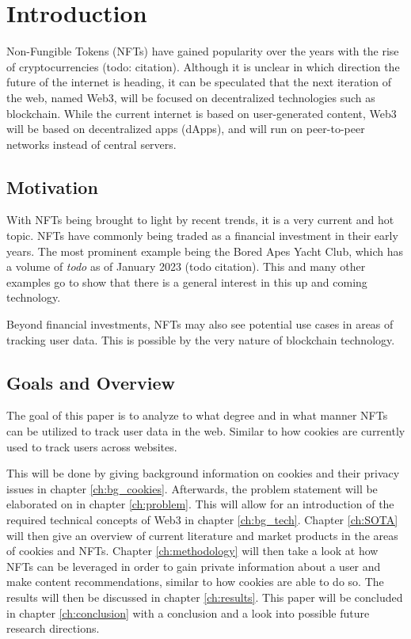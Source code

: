 \chapter{Introduction}
\label{ch:intro}

Non-Fungible Tokens (NFTs) have gained popularity over the years with the rise of cryptocurrencies (todo: citation). Although it is unclear in which direction the future of the internet is heading, it can be speculated that the next iteration of the web, named Web3, will be focused on decentralized technologies such as blockchain. While the current internet is based on user-generated content, Web3 will be based on decentralized apps (dApps), and will run on peer-to-peer networks instead of central servers.

%
%
\section{Motivation}
\label{sec:intro:motivation}
With NFTs being brought to light by recent trends, it is a very current and hot topic. NFTs have commonly being traded as a financial investment in their early years. The most prominent example being the Bored Apes Yacht Club, which has a volume of \textit{\color{red}todo} as of January 2023 (todo citation). This and many other examples go to show that there is a general interest in this up and coming technology.

Beyond financial investments, NFTs may also see potential use cases in areas of tracking user data. This is possible by the very nature of blockchain technology.


%
%
\section{Goals and Overview}
\label{sec:intro:overview}
The goal of this paper is to analyze to what degree and in what manner NFTs can be utilized to track user data in the web. Similar to how cookies are currently used to track users across websites.

This will be done by giving background information on cookies and their privacy issues in chapter \ref{ch:bg_cookies}. Afterwards, the problem statement will be elaborated on in chapter \ref{ch:problem}. This will allow for an introduction of the required technical concepts of Web3 in chapter \ref{ch:bg_tech}. Chapter \ref{ch:SOTA} will then give an overview of current literature and market products in the areas of cookies and NFTs. Chapter \ref{ch:methodology} will then take a look at how NFTs can be leveraged in order to gain private information about a user and make content recommendations, similar to how cookies are able to do so. The results will then be discussed in chapter \ref{ch:results}. This paper will be concluded in chapter \ref{ch:conclusion} with a conclusion and a look into possible future research directions.